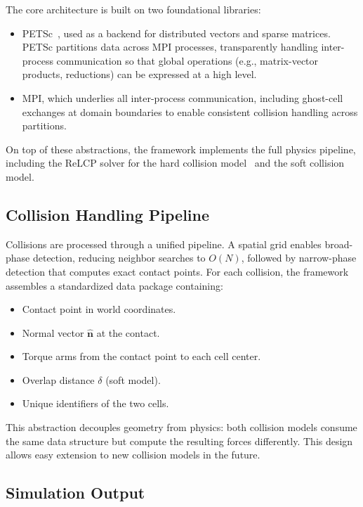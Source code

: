 \documentclass[conference]{IEEEtran}
\begin{document}
The core architecture is built on two foundational libraries:
\begin{itemize}
    \item PETSc~\cite{petsc-web-page}, used as a backend for distributed vectors and sparse matrices. PETSc partitions data across MPI processes, transparently handling inter-process communication so that global operations (e.g., matrix-vector products, reductions) can be expressed at a high level.
    \item MPI, which underlies all inter-process communication, including ghost-cell exchanges at domain boundaries to enable consistent collision handling across partitions.
\end{itemize}

On top of these abstractions, the framework implements the full physics pipeline, including the ReLCP solver for the hard collision model~\cite{Weady2024} and the soft collision model.


\subsection{Collision Handling Pipeline}

Collisions are processed through a unified pipeline. A spatial grid enables broad-phase detection, reducing neighbor searches to $O(N)$, followed by narrow-phase detection that computes exact contact points. For each collision, the framework assembles a standardized data package containing:

\begin{itemize}
    \item Contact point in world coordinates.
    \item Normal vector $\hat{\mathbf{n}}$ at the contact.
    \item Torque arms from the contact point to each cell center.
    \item Overlap distance $\delta$ (soft model).
    \item Unique identifiers of the two cells.
\end{itemize}

This abstraction decouples geometry from physics: both collision models consume the same data structure but compute the resulting forces differently. This design allows easy extension to new collision models in the future.

\subsection{Simulation Output}
\end{document}
